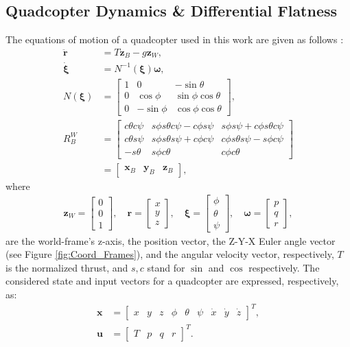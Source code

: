 \documentclass[journal,10pt]{IEEEtran}
\newcommand{\vect}[1]{\boldsymbol{\mathbf{#1}}}
\newcommand{\mat}[1]{\begin{bmatrix} #1 \end{bmatrix}}
\begin{document}
\subsection{Quadcopter Dynamics \& Differential Flatness} \label{Dynamics}
The equations of motion of a quadcopter used in this work are given as follows \cite{min_snap}: 
\begin{subequations} \label{dyn_model}
\begin{align}
    \ddot{\vect{r}} &\!=\! T\vect{z}_B -g\vect{z}_W, \label{dyn_model_acc}\\
    \dot{\vect{\xi}} &\!=\! N^{-1}(\vect{\xi})\vect{\omega},\\
    N(\vect{\xi}) &\!=\! \mat{1 & 0 & -\sin\theta\\
                         0 & \cos\phi & \sin\phi\cos\theta\\
                         0 & -\sin\phi & \cos\phi\cos\theta},\\
    R_B^W &\!=\! \mat{
c\theta c\psi & s\phi s\theta c\psi - c\phi s\psi & s\phi s\psi + c\phi s\theta c\psi\\
c\theta s\psi & s\phi s\theta s\psi + c\phi c\psi & c\phi s\theta s\psi - s\phi c\psi\\
-s\theta & s\phi c\theta & c\phi c\theta}\\
&= \mat{\vect{x}_B & \vect{y}_B & \vect{z}_B},\nonumber
\end{align}
\end{subequations}
where
\begin{align*}
  \vect{z}_W =\mat{0\\0\\1},\quad\vect{r}=\mat{x\\y\\z},\quad  \vect{\xi}=\mat{\phi \\\theta \\\psi},\quad \vect{\omega} =\mat{p \\q \\r},
\end{align*}
are the world-frame's z-axis, the position vector, the Z-Y-X Euler angle vector (see Figure \ref{fig:Coord_Frames}), and the angular velocity vector, respectively, $T$ is the normalized thrust, and $s,c$ stand for $\sin$ and $\cos$ respectively. The considered state and input vectors for a quadcopter are expressed, respectively, as:
\begin{subequations} \label{state_input}
\begin{align}
  \vect{x} &= \mat{x&y&z&\phi&\theta&\psi&\dot{x}&\dot{y}&\dot{z}}^T,\\
  \vect{u} &= \mat{T&p&q&r}^T.
\end{align}
\end{subequations}
\end{document}
